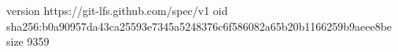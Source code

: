 version https://git-lfs.github.com/spec/v1
oid sha256:b0a90957da43ca25593e7345a5248376c6f586082a65b20b1166259b9aeee8be
size 9359
